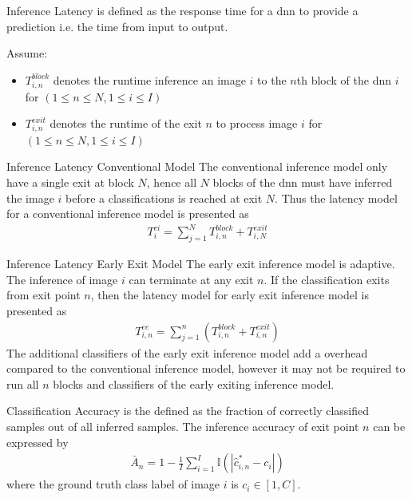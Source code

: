 	\begin{enumdescript}
		\item[Inference Latency] is defined as the response time for a \gls{dnn} to provide a prediction i.e. the time from input to output. 

		Assume:
		\begin{itemize}
			\item $T_{i,n}^{block}$ denotes the runtime inference an image $ i $ to the $ n $th block of the \gls{dnn} $ i $ for $ \left(1\leq n \leq N, 1 \leq i \leq I\right) $
			\item $T_{i,n}^{exit}$ denotes the runtime of the exit $ n $  to process image $i$ for $ \left(1\leq n \leq N, 1 \leq i \leq I\right) $
		\end{itemize}
		\begin{enumdescript}
			\item[Inference Latency Conventional Model] The conventional inference model only have a single exit at block $ N $, hence all $ N $ blocks of the \gls{dnn} must have inferred the image $ i $ before a classifications is reached at exit $ N $. Thus the latency model for a conventional inference model is presented as
			\begin{align}
			T^{ci}_{i}= \sum_{j=1}^{N} T_{i,n}^{block} + T_{i,N}^{exit}
			\end{align}
			\item[Inference Latency Early Exit Model] The early exit inference model is adaptive. The inference of image $ i $ can terminate at any exit $ n $. If the classification exits from exit point $ n $, then the latency model for early exit inference model is presented as
			\begin{align}
			T_{i,n}^{ee}=\sum_{j=1}^{n} \left(T_{i,n}^{block} + T_{i,n}^{exit} \right) 
			\end{align}
			The additional classifiers of the early exit inference model add a overhead compared to the conventional inference model, however it may not be required to run all $ n $ blocks and classifiers of the early exiting inference model. 
		\end{enumdescript}
		
		\item[Classification Accuracy] is the defined as the fraction of correctly classified samples out of all inferred samples. The inference accuracy of exit point $ n $ can be expressed by
		\begin{align}
		\bar{A}_{n}=1-\frac{1}{I} \sum_{i=1}^{I} \mathbb{I}\left(\left|\hat{c}^*_{i,n}-c_{i}\right|\right) \label{eq:accuracy}
		\end{align}
		where the ground truth class label of image $ i $ is $ c_i \in \left[1, C \right] $.
		

\end{enumdescript}
